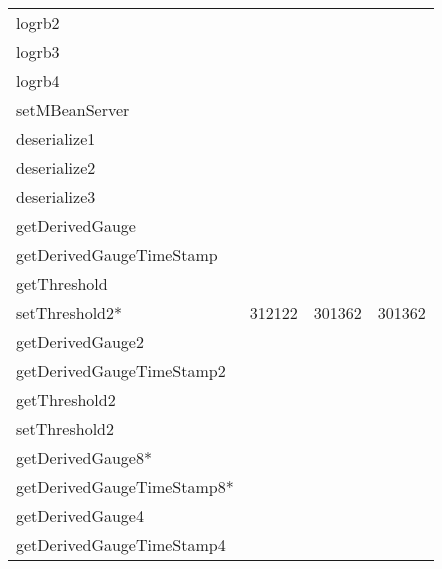 \documentclass{article}
\newcommand{\xmark}{\ding{55}}
\begin{document}
\begin{longtable}{ l r r r }
logrb2 & \multicolumn{1}{c}{\xmark} & \multicolumn{1}{c}{\xmark} & \multicolumn{1}{c}{\xmark} \\
logrb3 & \multicolumn{1}{c}{\xmark} & \multicolumn{1}{c}{\xmark} & \multicolumn{1}{c}{\xmark} \\
logrb4 & \multicolumn{1}{c}{\xmark} & \multicolumn{1}{c}{\xmark} & \multicolumn{1}{c}{\xmark} \\
setMBeanServer & \multicolumn{1}{c}{\xmark} & \multicolumn{1}{c}{\xmark} & \multicolumn{1}{c}{\xmark} \\
deserialize1 & \multicolumn{1}{c}{\xmark} & \multicolumn{1}{c}{\xmark} & \multicolumn{1}{c}{\xmark} \\
deserialize2 & \multicolumn{1}{c}{\xmark} & \multicolumn{1}{c}{\xmark} & \multicolumn{1}{c}{\xmark} \\
deserialize3 & \multicolumn{1}{c}{\xmark} & \multicolumn{1}{c}{\xmark} & \multicolumn{1}{c}{\xmark} \\
getDerivedGauge & \multicolumn{1}{c}{\xmark} & \multicolumn{1}{c}{\xmark} & \multicolumn{1}{c}{\xmark} \\
getDerivedGaugeTimeStamp & \multicolumn{1}{c}{\xmark} & \multicolumn{1}{c}{\xmark} & \multicolumn{1}{c}{\xmark} \\
getThreshold & \multicolumn{1}{c}{\xmark} & \multicolumn{1}{c}{\xmark} & \multicolumn{1}{c}{\xmark} \\
setThreshold2* & 312122 & 301362 & 301362 \\
getDerivedGauge2 & \multicolumn{1}{c}{\xmark} & \multicolumn{1}{c}{\xmark} & \multicolumn{1}{c}{\xmark} \\
getDerivedGaugeTimeStamp2 & \multicolumn{1}{c}{\xmark} & \multicolumn{1}{c}{\xmark} & \multicolumn{1}{c}{\xmark} \\
getThreshold2 & \multicolumn{1}{c}{\xmark} & \multicolumn{1}{c}{\xmark} & \multicolumn{1}{c}{\xmark} \\
setThreshold2 & \multicolumn{1}{c}{\xmark} & \multicolumn{1}{c}{\xmark} & \multicolumn{1}{c}{\xmark} \\
getDerivedGauge8* & \multicolumn{1}{c}{\xmark} & \multicolumn{1}{c}{\xmark} & \multicolumn{1}{c}{\xmark} \\
getDerivedGaugeTimeStamp8* & \multicolumn{1}{c}{\xmark} & \multicolumn{1}{c}{\xmark} & \multicolumn{1}{c}{\xmark} \\
getDerivedGauge4 & \multicolumn{1}{c}{\xmark} & \multicolumn{1}{c}{\xmark} & \multicolumn{1}{c}{\xmark} \\
getDerivedGaugeTimeStamp4 & \multicolumn{1}{c}{\xmark} & \multicolumn{1}{c}{\xmark} & \multicolumn{1}{c}{\xmark} \\

\end{longtable}
\end{document}
